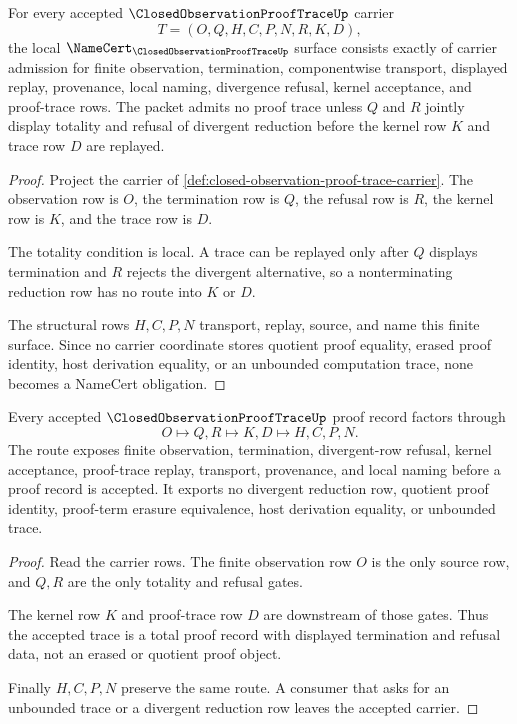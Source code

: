 \begin{theorem}
\label{thm:closed-observation-proof-trace-obligations}
For every accepted $\ClosedObservationProofTraceUp$ carrier
$$
T=(O,Q,H,C,P,N,R,K,D),
$$
the local $\NameCert_{\ClosedObservationProofTraceUp}$ surface consists exactly of carrier admission for finite observation, termination, componentwise transport, displayed replay, provenance, local naming, divergence refusal, kernel acceptance, and proof-trace rows. The packet admits no proof trace unless $Q$ and $R$ jointly display totality and refusal of divergent reduction before the kernel row $K$ and trace row $D$ are replayed.
\end{theorem}
\begin{proof}
Project the carrier of \autoref{def:closed-observation-proof-trace-carrier}. The observation row is $O$, the termination row is $Q$, the refusal row is $R$, the kernel row is $K$, and the trace row is $D$.

The totality condition is local. A trace can be replayed only after $Q$ displays termination and $R$ rejects the divergent alternative, so a nonterminating reduction row has no route into $K$ or $D$.

The structural rows $H,C,P,N$ transport, replay, source, and name this finite surface. Since no carrier coordinate stores quotient proof equality, erased proof identity, host derivation equality, or an unbounded computation trace, none becomes a NameCert obligation.
\end{proof}

\begin{theorem}
\label{thm:closed-observation-proof-trace-totality-route}
Every accepted $\ClosedObservationProofTraceUp$ proof record factors through
$$
O \longmapsto Q,R \longmapsto K,D \longmapsto H,C,P,N .
$$
The route exposes finite observation, termination, divergent-row refusal, kernel acceptance, proof-trace replay, transport, provenance, and local naming before a proof record is accepted. It exports no divergent reduction row, quotient proof identity, proof-term erasure equivalence, host derivation equality, or unbounded trace.
\end{theorem}
\begin{proof}
Read the carrier rows. The finite observation row $O$ is the only source row, and $Q,R$ are the only totality and refusal gates.

The kernel row $K$ and proof-trace row $D$ are downstream of those gates. Thus the accepted trace is a total proof record with displayed termination and refusal data, not an erased or quotient proof object.

Finally $H,C,P,N$ preserve the same route. A consumer that asks for an unbounded trace or a divergent reduction row leaves the accepted carrier.
\end{proof}

